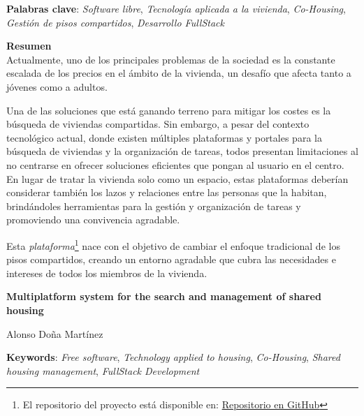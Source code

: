 
\vspace{0.5cm}
\noindent\textbf{Palabras clave}: \textit{Software libre}, \textit{Tecnología aplicada a la vivienda}, \textit{Co-Housing}, \textit{Gestión de pisos compartidos}, \textit{Desarrollo FullStack}
\vspace{0.7cm}

\noindent\textbf{Resumen}\\

Actualmente, uno de los principales problemas de la sociedad es la constante escalada de los precios en el ámbito de la vivienda, un desafío que afecta tanto a jóvenes como a adultos.

Una de las soluciones que está ganando terreno para mitigar los costes es la búsqueda de viviendas compartidas. Sin embargo, a pesar del contexto tecnológico actual, donde existen múltiples plataformas y portales para la búsqueda de viviendas y la organización de tareas, todos presentan limitaciones al no centrarse en ofrecer soluciones eficientes que pongan al usuario en el centro. En lugar de tratar la vivienda solo como un espacio, estas plataformas deberían considerar también los lazos y relaciones entre las personas que la habitan, brindándoles herramientas para la gestión y organización de tareas y promoviendo una convivencia agradable.

Esta \textit{plataforma}\footnote{El repositorio del proyecto está disponible en: 
\href{https://github.com/alonsodm12/TFG_COHOUSING}{Repositorio en GitHub}} nace con el objetivo de cambiar el enfoque tradicional de los pisos compartidos, creando un entorno agradable que cubra las necesidades e intereses de todos los miembros de la vivienda.

\cleardoublepage


\thispagestyle{empty}




\begin{center}
	{\large\bfseries Multiplatform system for the search and management of shared housing}\\
\end{center}
\begin{center}
	Alonso Doña Martínez\\
\end{center}
\vspace{0.5cm}
\noindent\textbf{Keywords}: \textit{Free software}, \textit{Technology applied to housing}, \textit{Co-Housing}, \textit{Shared housing management}, \textit{FullStack Development}
\vspace{0.7cm}

